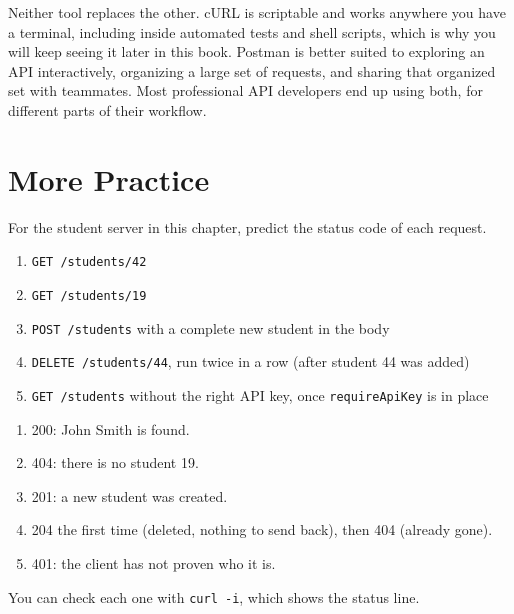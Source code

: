Neither tool replaces the other. cURL is scriptable and works anywhere
you have a terminal, including inside automated tests and shell
scripts, which is why you will keep seeing it later in this book. Postman
is better suited to exploring an API interactively, organizing a large
set of requests, and sharing that organized set with teammates. Most
professional API developers end up using both, for different parts of
their workflow.

\section{More Practice}

\begin{Exercise}[title={Predict the Status Code}, label=webapi_codes]
For the student server in this chapter, predict the status code of each request.
\begin{enumerate}
\item \verb|GET /students/42|
\item \verb|GET /students/19|
\item \verb|POST /students| with a complete new student in the body
\item \verb|DELETE /students/44|, run twice in a row (after student 44 was added)
\item \verb|GET /students| without the right API key, once \verb|requireApiKey| is in place
\end{enumerate}
\end{Exercise}
\begin{Answer}[ref=webapi_codes]
\begin{enumerate}
\item 200: John Smith is found.
\item 404: there is no student 19.
\item 201: a new student was created.
\item 204 the first time (deleted, nothing to send back), then 404 (already gone).
\item 401: the client has not proven who it is.
\end{enumerate}
You can check each one with \verb|curl -i|, which shows the status line.
\end{Answer}


